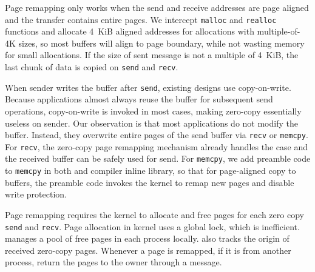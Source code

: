 Page remapping only works when the send and receive addresses are page aligned and the transfer contains entire pages.
We intercept \texttt{malloc} and \texttt{realloc} functions and allocate 4~KiB aligned addresses for allocations with multiple-of-4K sizes, so most buffers will align to page boundary, while not wasting memory for small allocations.
If the size of sent message is not a multiple of 4~KiB, the last chunk of data is copied on \texttt{send} and \texttt{recv}.


When sender writes the buffer after \texttt{send}, existing designs use copy-on-write. %
Because applications almost always reuse the buffer for subsequent send operations, copy-on-write is invoked in most cases, making zero-copy essentially useless on sender.
Our observation is that most applications do not modify the buffer. Instead, they overwrite entire pages of the send buffer via \texttt{recv} or \texttt{memcpy}. %
For \texttt{recv}, the zero-copy page remapping mechanism already handles the case and the received buffer can be safely used for send. 
For \texttt{memcpy}, we add preamble code to \texttt{memcpy} in both \libipc{} and compiler inline library, so that
for page-aligned copy to \libipc{} buffers, the preamble code invokes the kernel to remap new pages and disable write protection.

Page remapping requires the kernel to allocate and free pages for each zero copy \texttt{send} and \texttt{recv}. 
Page allocation in kernel uses a global lock, which is inefficient. \libipc{} manages a pool of free pages in each process locally.
\libipc{} also tracks the origin of received zero-copy pages.
Whenever a page is remapped, if it is from another process, \libipc{} return the pages to the owner through a message.

